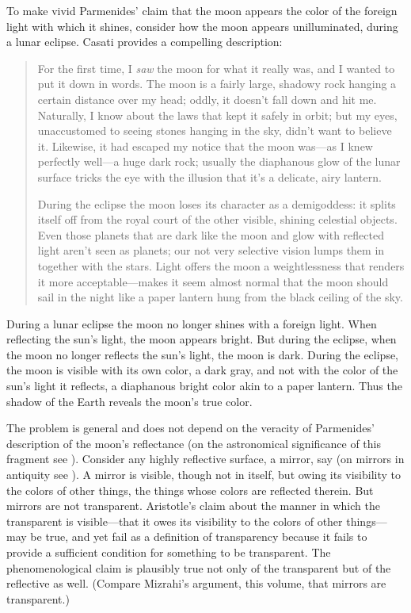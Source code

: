 \documentclass[12pt]{article}
\begin{document}
To make vivid Parmenides' claim that the moon appears the color of the foreign light with which it shines, consider how the moon appears unilluminated, during a lunar eclipse. Casati provides a compelling description:
\begin{quotation}
	\noindent For the first time, I \emph{saw} the moon for what it really was, and I wanted to put it down in words. The moon is a fairly large, shadowy rock hanging a certain distance over my head; oddly, it doesn't fall down and hit me. Naturally, I know about the laws that kept it safely in orbit; but my eyes, unaccustomed to seeing stones hanging in the sky, didn't want to believe it. Likewise, it had escaped my notice that the moon was---as I knew perfectly well---a huge dark rock; usually the diaphanous glow of the lunar surface tricks the eye with the illusion that it's a delicate, airy lantern.
	
	During the eclipse the moon loses its character as a demigoddess: it splits itself off from the royal court of the other visible, shining celestial objects. Even those planets that are dark like the moon and glow with reflected light aren't seen as planets; our not very selective vision lumps them in together with the stars. Light offers the moon a weightlessness that renders it more acceptable---makes it seem almost normal that the moon should sail in the night like a paper lantern hung from the black ceiling of the sky. \citep[3--4]{Casati:2003aa}
\end{quotation}
During a lunar eclipse the moon no longer shines with a foreign light. When reflecting the sun's light, the moon appears bright. But during the eclipse, when the moon no longer reflects the sun's light, the moon is dark. During the eclipse, the moon is visible with its own color, a dark gray, and not with the color of the sun's light it reflects, a diaphanous bright color akin to a paper lantern. Thus the shadow of the Earth reveals the moon's true color.

The problem is general and does not depend on the veracity of Parmenides' description of the moon's reflectance (on the astronomical significance of this fragment see \citealt{Popper:1998aa}). Consider any highly reflective surface, a mirror, say (on mirrors in antiquity see \citealt{Schweig:1941yu}). A mirror is visible, though not in itself, but owing its visibility to the colors of other things, the things whose colors are reflected therein. But mirrors are not transparent. Aristotle's claim about the manner in which the transparent is visible---that it owes its visibility to the colors of other things---may be true, and yet fail as a definition of transparency because it fails to provide a sufficient condition for something to be transparent. The phenomenological claim is plausibly true not only of the transparent but of the reflective as well. (Compare Mizrahi's argument, this volume, that mirrors are transparent.)
\end{document}
